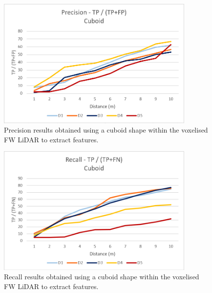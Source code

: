 \documentclass{subfiles}
\begin{document}
        \begin{figure} [h!]
        	\centering
        	\includegraphics[width=0.87\textwidth]{img/dead/results/Precision_Cuboid}
        	\caption[Precision results obtained using a cuboid shape]{Precision results obtained using a cuboid shape within the voxelised FW LiDAR to extract features. }
        	\label{fig:Precision_Cuboid}
        \end{figure}
    
        \begin{figure} [h!]
        	\centering
        	\includegraphics[width=0.87\textwidth]{img/dead/results/Recall_Cuboid}
        	\caption[Recall results obtained using a cuboid shape]{Recall results obtained using a cuboid shape within the voxelised FW LiDAR to extract features. }
        	\label{fig:Recall_Cuboid}
        \end{figure}
        
\end{document}

